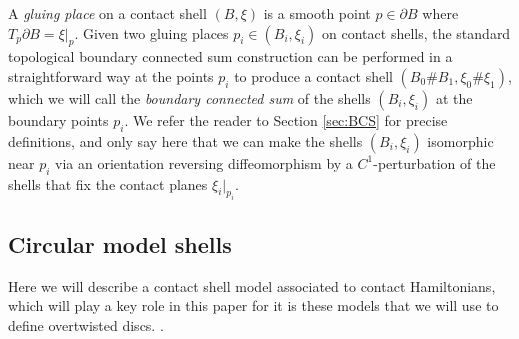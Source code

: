 \documentclass[12pt]{paper}
\theoremstyle{plain}
\theoremstyle{definition}
\newcommand{\p}{\partial}
\numberwithin{figure}{section}
\begin{document}
     A \emph{gluing place} on a contact shell $(B, \xi)$ is a smooth point $p \in \p B$ where  $T_{p}\p B = \xi|_{p}$.
     Given two gluing places $p_i \in (B_i, \xi_i)$ on contact shells,
     the standard topological boundary connected sum construction can be performed in a  straightforward way
     at the points $p_i$ to produce a contact shell $(B_0\#B_1,\xi_0\#\xi_1)$, which we will call the {\em boundary connected sum}
of the shells  $(B_i,\xi_i)$ at the boundary  points $p_i$.
%
%     
We refer the reader to Section \ref{sec:BCS} for precise definitions, and only say here that we can make the shells 
$(B_i,\xi_i)$ isomorphic near $p_i$ via an orientation reversing diffeomorphism by a $C^1$-perturbation of the shells that fix the contact planes $\xi_i|_{p_i}$.

\subsection{Circular model shells}\label{sec:ContactHamShell}

Here we will describe a contact shell model associated to contact Hamiltonians, which will play a key role in this paper
for it is these models that we will  use to define overtwisted discs.   .
\end{document}
